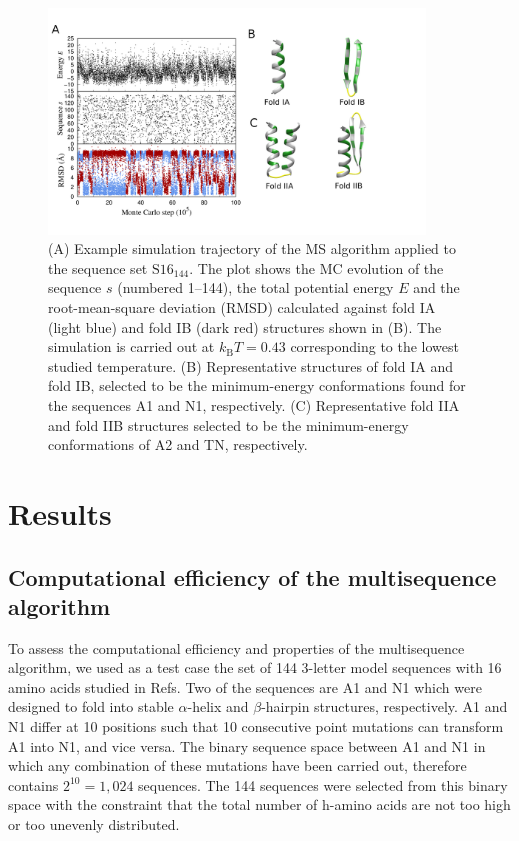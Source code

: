 \documentclass[%
 aip,
rsi,%
 amsmath,amssymb,
 reprint,%
]{revtex4-1}
\newcommand	 {\sbar}	{{s}}
\newcommand	 {\kb}		{{k_\mathrm{B}}}
\begin{document}
\begin{figure}
\includegraphics[width=10.0cm]{MCTrajFolds}
\caption{(A) Example simulation trajectory of the MS algorithm applied to the sequence set $\mathrm{S16}_{144}$. The plot shows the MC evolution of the sequence $\sbar$ (numbered 1--144), the total potential energy $E$ and the root-mean-square deviation (RMSD) calculated against fold IA (light blue) and fold IB (dark red) structures shown in (B). The simulation is carried out at $\kb T = 0.43$ corresponding to the lowest studied temperature.  (B) Representative structures of fold IA and fold IB, selected to be the minimum-energy conformations found for the sequences A1 and N1, respectively. (C) Representative fold IIA and fold IIB structures selected to be the minimum-energy conformations of A2 and TN, respectively. }
\end{figure}

%
%
%
%

\section{Results}

\subsection{Computational efficiency of the multisequence algorithm}
\noindent
To assess the computational efficiency and properties of the multisequence algorithm, we used as a test case the set of 144 3-letter model sequences with 16 amino acids studied in Refs.\cite{Holzgrafe2014} Two of the sequences are A1 and N1 which were designed to fold into stable $\alpha$-helix and $\beta$-hairpin structures, respectively. A1 and N1 differ at 10 positions such that 10 consecutive point mutations can transform A1 into N1, and vice versa. The binary sequence space between A1 and N1 in which any combination of these mutations have been carried out, therefore contains $2^{10}=1,024$ sequences. The 144 sequences were selected from this binary space with the constraint that the total number of h-amino acids are not too high or too unevenly distributed.~\cite{Holzgrafe2014}
\end{document}
